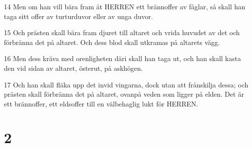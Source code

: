 \par 14 Men om han vill bära fram åt HERREN ett brännoffer av fåglar, så skall han taga sitt offer av turturduvor eller av unga duvor.
\par 15 Och prästen skall bära fram djuret till altaret och vrida huvudet av det och förbränna det på altaret. Och dess blod skall utkramas på altarets vägg.
\par 16 Men dess kräva med orenligheten däri skall han taga ut, och han skall kasta den vid sidan av altaret, österut, på askhögen.
\par 17 Och han skall fläka upp det invid vingarna, dock utan att frånskilja dessa; och prästen skall förbränna det på altaret, ovanpå veden som ligger på elden. Det är ett brännoffer, ett eldsoffer till en välbehaglig lukt för HERREN.

\chapter{2}

